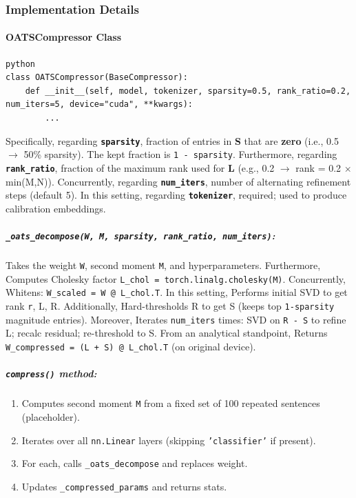 \subsubsection*{Implementation Details}

\paragraph{OATSCompressor Class}

\vspace{0.5em}
\begin{mdframed}[backgroundcolor=codebg, linecolor=codeframe, linewidth=1pt, roundcorner=4pt, innerleftmargin=2pt, innerrightmargin=5pt, innertopmargin=5pt, innerbottommargin=5pt]
\begin{lstlisting}
python
class OATSCompressor(BaseCompressor):
    def __init__(self, model, tokenizer, sparsity=0.5, rank_ratio=0.2, num_iters=5, device="cuda", **kwargs):
        ...
\end{lstlisting}
\end{mdframed}
\vspace{0.5em}

Specifically, regarding \textbf{\texttt{sparsity}}, fraction of entries in \textbf{S} that are \textbf{zero} (i.e., 0.5 $\rightarrow$ 50\% sparsity). The kept fraction is \texttt{1 - sparsity}. Furthermore, regarding \textbf{\texttt{rank\_ratio}}, fraction of the maximum rank used for \textbf{L} (e.g., 0.2 $\rightarrow$ rank = 0.2 $\times$ min(M,N)). Concurrently, regarding \textbf{\texttt{num\_iters}}, number of alternating refinement steps (default 5). In this setting, regarding \textbf{\texttt{tokenizer}}, required; used to produce calibration embeddings.


\subparagraph{\texttt{\_oats\_decompose(W, M, sparsity, rank\_ratio, num\_iters)}:}
Takes the weight \texttt{W}, second moment \texttt{M}, and hyperparameters. Furthermore, Computes Cholesky factor \texttt{L\_chol = torch.linalg.cholesky(M)}. Concurrently, Whitens: \texttt{W\_scaled = W @ L\_chol.T}. In this setting, Performs initial SVD to get rank \texttt{r}, L, R. Additionally, Hard-thresholds R to get S (keeps top \texttt{1-sparsity} magnitude entries). Moreover, Iterates \texttt{num\_iters} times: SVD on \texttt{R - S} to refine L; recalc residual; re-threshold to S. From an analytical standpoint, Returns \texttt{W\_compressed = (L + S) @ L\_chol.T} (on original device).


\subparagraph{\texttt{compress()} method:}
\begin{enumerate}
\item Computes second moment \texttt{M} from a fixed set of 100 repeated sentences (placeholder).
\item Iterates over all \texttt{nn.Linear} layers (skipping \texttt{'classifier'} if present).
\item For each, calls \texttt{\_oats\_decompose} and replaces weight.
\item Updates \texttt{\_compressed\_params} and returns stats.

\end{enumerate}
